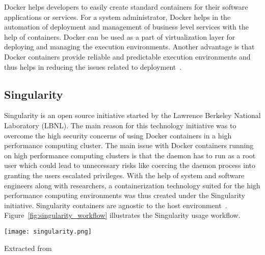 Docker helps developers to easily create standard containers for their 
software applications or services. For a system administrator, Docker 
helps in the automation of deployment and management of business level 
services with the help of containers. Docker can be used as a part of 
virtualization layer for deploying and managing the execution 
environments. Another advantage is that Docker containers provide 
reliable and predictable execution environments and thus helps in 
reducing the issues related to 
deployment~\cite{DBLP:journals/corr/MorrisVHM17}.

\subsection{Singularity}
Singularity is an open source initiative started by the Lawrence 
Berkeley National Laboratory (LBNL). The main reason for this 
technology initiative was to overcome the high security concerns of 
using Docker containers in a high performance computing cluster. The 
main issue with Docker containers running on high performance 
computing clusters is that the daemon has to run as a root user which 
could lead to unnecessary risks like coercing the daemon process into 
granting the users escalated privileges. With the help of system and 
software engineers along with researchers, a containerization 
technology suited for the high performance computing environments was 
thus created under the Singularity initiative. Singularity containers 
are agnostic to the host 
environment~\cite{10.1371/journal.pone.0177459}. 
Figure~\ref{fig:singularity_workflow} illustrates the Singularity usage 
workflow.

\begin{center}
\texttt{[image: singularity.png]}
\label{fig:singularity_workflow}
\caption*{Extracted from \cite{10.1371/journal.pone.0177459}}
\end{center}

